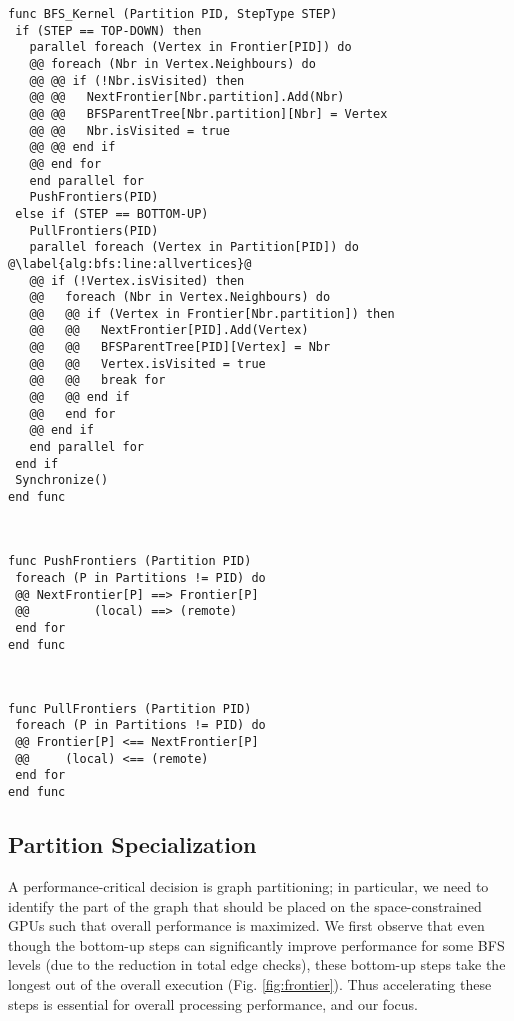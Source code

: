 \documentclass{llncs}
\begin{document}
\begin{minipage}{\textwidth}
\label{alg:bfs}
\begin{minipage}{0.60\textwidth}
\begin{lstlisting}
func BFS_Kernel (Partition PID, StepType STEP)
 if (STEP == TOP-DOWN) then
   parallel foreach (Vertex in Frontier[PID]) do
   @@ foreach (Nbr in Vertex.Neighbours) do
   @@ @@ if (!Nbr.isVisited) then
   @@ @@   NextFrontier[Nbr.partition].Add(Nbr)
   @@ @@   BFSParentTree[Nbr.partition][Nbr] = Vertex
   @@ @@   Nbr.isVisited = true
   @@ @@ end if
   @@ end for
   end parallel for
   PushFrontiers(PID)
 else if (STEP == BOTTOM-UP) 
   PullFrontiers(PID)
   parallel foreach (Vertex in Partition[PID]) do  @\label{alg:bfs:line:allvertices}@
   @@ if (!Vertex.isVisited) then
   @@   foreach (Nbr in Vertex.Neighbours) do
   @@   @@ if (Vertex in Frontier[Nbr.partition]) then
   @@   @@   NextFrontier[PID].Add(Vertex)
   @@   @@   BFSParentTree[PID][Vertex] = Nbr
   @@   @@   Vertex.isVisited = true
   @@   @@   break for
   @@   @@ end if
   @@   end for
   @@ end if
   end parallel for
 end if
 Synchronize()
end func
\end{lstlisting}
\end{minipage}
\begin{minipage}{.39\textwidth}
 \newline
{}
\label{alg:scatter}
\begin{lstlisting}
func PushFrontiers (Partition PID)
 foreach (P in Partitions != PID) do
 @@ NextFrontier[P] ==> Frontier[P]
 @@         (local) ==> (remote)
 end for
end func
\end{lstlisting}
 \newline
 \newline
 \newline
{}
\label{alg:gather}
\begin{lstlisting}
func PullFrontiers (Partition PID)
 foreach (P in Partitions != PID) do
 @@ Frontier[P] <== NextFrontier[P]
 @@     (local) <== (remote)
 end for
end func
\end{lstlisting}
\end{minipage}
\end{minipage}
\subsection{Partition Specialization}\label{sec:partitioning}A performance-critical decision is graph partitioning; in particular, we need to identify the part of the graph that should be placed on the space-constrained GPUs such that overall performance is maximized. We first observe that even though the bottom-up steps can significantly improve performance for some BFS levels (due to the reduction in total edge checks), these bottom-up steps  take the longest out of the overall execution (Fig. \ref{fig:frontier}). Thus accelerating these steps is essential for overall processing performance, and our focus.
\end{document}
